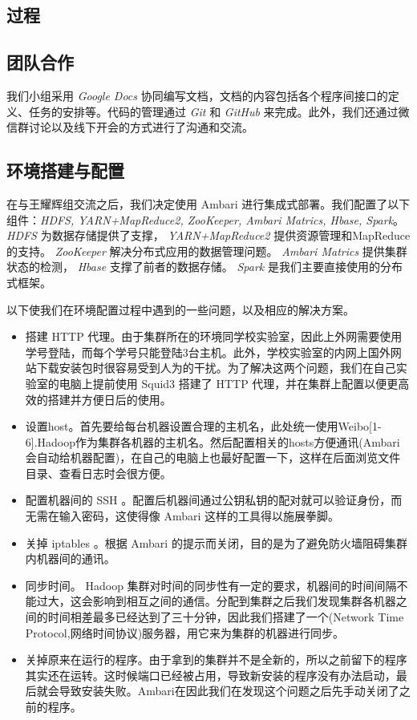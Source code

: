 \documentclass[12pt, oneside]{article}
\begin{document}
\begin{spacing}{1.5}
\begin{CJK}{UTF8}{gbsn}
\section{过程}
\subsection{团队合作}
我们小组采用 {\it Google Docs} 协同编写文档，文档的内容包括各个程序间接口的定义、任务的安排等。代码的管理通过 {\it Git} 和 {\it GitHub} 来完成。此外，我们还通过微信群讨论以及线下开会的方式进行了沟通和交流。

\subsection{环境搭建与配置}
在与王耀辉组交流之后，我们决定使用 Ambari 进行集成式部署。我们配置了以下组件：{\it HDFS, YARN+MapReduce2, ZooKeeper, Ambari  Matrics, Hbase, Spark}。 {\it HDFS} 为数据存储提供了支撑， {\it YARN+MapReduce2} 提供资源管理和MapReduce的支持。 {\it ZooKeeper} 解决分布式应用的数据管理问题。 {\it Ambari Matrics} 提供集群状态的检测， {\it Hbase} 支撑了前者的数据存储。 {\it Spark} 是我们主要直接使用的分布式框架。

以下使我们在环境配置过程中遇到的一些问题，以及相应的解决方案。

\begin{itemize}
	\item 搭建 HTTP 代理。由于集群所在的环境同学校实验室，因此上外网需要使用学号登陆，而每个学号只能登陆3台主机。此外，学校实验室的内网上国外网站下载安装包时很容易受到人为的干扰。为了解决这两个问题，我们在自己实验室的电脑上提前使用 Squid3 搭建了 HTTP 代理，并在集群上配置以便更高效的搭建并方便日后的使用。
	\item 设置host。首先要给每台机器设置合理的主机名，此处统一使用Weibo[1-6].Hadoop作为集群各机器的主机名。然后配置相关的hosts方便通讯(Ambari会自动给机器配置)，在自己的电脑上也最好配置一下，这样在后面浏览文件目录、查看日志时会很方便。
	\item 配置机器间的 SSH 。配置后机器间通过公钥私钥的配对就可以验证身份，而无需在输入密码，这使得像 Ambari 这样的工具得以施展拳脚。
	\item 关掉 iptables 。根据 Ambari 的提示而关闭，目的是为了避免防火墙阻碍集群内机器间的通讯。
	\item 同步时间。 Hadoop 集群对时间的同步性有一定的要求，机器间的时间间隔不能过大，这会影响到相互之间的通信。分配到集群之后我们发现集群各机器之间的时间相差最多已经达到了三十分钟，因此我们搭建了一个(Network Time Protocol,网络时间协议)服务器，用它来为集群的机器进行同步。
	\item 关掉原来在运行的程序。由于拿到的集群并不是全新的，所以之前留下的程序其实还在运转。这时候端口已经被占用，导致新安装的程序没有办法启动，最后就会导致安装失败。Ambari在因此我们在发现这个问题之后先手动关闭了之前的程序。
\end{itemize}


\end{CJK}
\end{spacing}
\end{document}

